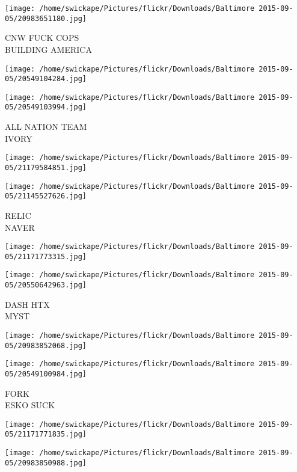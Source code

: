 \documentclass[10pt,letterpaper]{article}
\begin{document}
\vspace{0.25in}
\texttt{[image: /home/swickape/Pictures/flickr/Downloads/Baltimore 2015-09-05/20983651180.jpg]}

CNW FUCK COPS\\
BUILDING AMERICA
\pagebreak

\texttt{[image: /home/swickape/Pictures/flickr/Downloads/Baltimore 2015-09-05/20549104284.jpg]}

\vspace{0.25in}
\texttt{[image: /home/swickape/Pictures/flickr/Downloads/Baltimore 2015-09-05/20549103994.jpg]}

ALL NATION TEAM\\
IVORY
\pagebreak

\texttt{[image: /home/swickape/Pictures/flickr/Downloads/Baltimore 2015-09-05/21179584851.jpg]}

\vspace{0.25in}
\texttt{[image: /home/swickape/Pictures/flickr/Downloads/Baltimore 2015-09-05/21145527626.jpg]}

RELIC\\
NAVER
\pagebreak

\texttt{[image: /home/swickape/Pictures/flickr/Downloads/Baltimore 2015-09-05/21171773315.jpg]}

\vspace{0.25in}
\texttt{[image: /home/swickape/Pictures/flickr/Downloads/Baltimore 2015-09-05/20550642963.jpg]}

DASH HTX\\
MYST
\pagebreak

\texttt{[image: /home/swickape/Pictures/flickr/Downloads/Baltimore 2015-09-05/20983852068.jpg]}

\vspace{0.25in}
\texttt{[image: /home/swickape/Pictures/flickr/Downloads/Baltimore 2015-09-05/20549100984.jpg]}

FORK\\
ESKO SUCK
\pagebreak

\texttt{[image: /home/swickape/Pictures/flickr/Downloads/Baltimore 2015-09-05/21171771835.jpg]}

\vspace{0.25in}
\texttt{[image: /home/swickape/Pictures/flickr/Downloads/Baltimore 2015-09-05/20983850988.jpg]}
\end{document}
